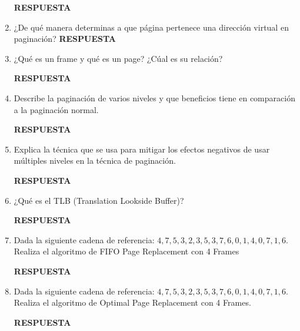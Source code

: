 \documentclass[12pt]{article}
\begin{document}
\begin{enumerate}
    \textbf{RESPUESTA}

    \item ¿De qué manera determinas a que página pertenece una dirección virtual en paginación?
    \vspace{0mm}
    \textbf{RESPUESTA}

    \item ¿Qué es un frame y qué es un page? ¿Cúal es su relación?
    \vspace{2mm}
    
    \textbf{RESPUESTA}

    \item Describe la paginación de varios niveles y que beneficios tiene en comparación a la paginación normal.
    \vspace{2mm}
    
    \textbf{RESPUESTA}

    \item Explica la técnica que se usa para mitigar los efectos negativos de usar múltiples niveles en la técnica de paginación.
    \vspace{2mm}
    
    \textbf{RESPUESTA}

    \item ¿Qué es el TLB (Translation Lookside Buffer)?
    \vspace{2mm}
    
    \textbf{RESPUESTA}

    \item Dada la siguiente cadena de referencia: $4,7,5,3,2,3,5,3,7,6,0,1,4,0,7,1,6.$ Realiza el algoritmo de FIFO Page Replacement con 4 Frames
    \vspace{2mm}
    
    \textbf{RESPUESTA}

    \item Dada la siguiente cadena de referencia: $4,7,5,3,2,3,5,3,7,6,0,1,4,0,7,1,6.$ Realiza el algoritmo de Optimal Page Replacement con 4 Frames.
    \vspace{2mm}
    
    \textbf{RESPUESTA}

\end{enumerate}
\end{document}
